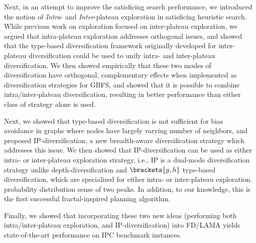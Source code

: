 
Next, in an attempt to improve the satisficing search performance,
we introduced the notion of \emph{Intra}- and
\emph{Inter}-plateau exploration in satisficing heuristic search.
While  previous work on exploration focused on inter-plateau exploration,
we argued that intra-plateau exploration addresses orthogonal issues, and showed that 
the type-based diversification framework originally developed for inter-plateau diversification could be used to unify intra- and inter-plateau diversification.
We then showed empirically that these two modes of diversification have 
orthogonal, complementary effects when implemented as diversification strategies for GBFS, %
and showed that it is possible to combine intra/inter-plateau diversification, 
resulting in better performance than either class of strategy alone is used.

Next, we showed that type-based diversification is not sufficient for
bias avoidance in graphs where nodes have largely varying number of
neighbors, and proposed IP-diversification, a new breadth-aware
diversification strategy which addresses this issue. We then showed that
IP-diversification can be used as either intra- or inter-plateau
exploration strategy, i.e., IP is a dual-mode diversification strategy
unlike depth-diversification and $\brackets{g,h}$ type-based
diversification, which are specialized for either intra- or
inter-plateau exploration. %
probability distribution sense of two peaks.  In addition, to our
knowledge, this is the first successful fractal-inspired
planning algorithm.

Finally, we showed that incorporating these two new ideas (performing
both intra/inter-plateau exploration, and IP-diversification) into
FD/LAMA yields state-of-the-art performance on IPC benchmark instances.


